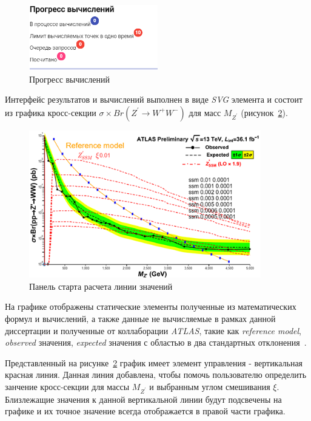 \begin{figure}[!h]
	\centering
	\includegraphics[width=0.5\textwidth]{figures/progress.png}
	\caption{Прогресс вычислений}
	\label{fig:progress}
\end{figure}

Интерфейс результатов и вычислений выполнен в виде \textit{SVG} элемента и состоит из графика кросс-секции $\sigma \times Br({Z}^{\prime} \rightarrow {W}^{+}{W}^{-})$ для масс ${M}_{{Z}^{\prime}}$ (рисунок~\ref{fig:graph-1}).

\begin{figure}[!h]
	\centering
	\includegraphics[width=0.9\textwidth]{figures/graph-1.png}
	\caption{Панель старта расчета линии значений}
	\label{fig:graph-1}
\end{figure}

На графике отображены статические элементы полученные из математических формул и вычислений, а также данные не вычисляемые в рамках данной диссертации и полученные от коллаборации \textit{ATLAS}, такие  как \textit{reference model}, \textit{observed} значения, \textit{expected} значения с областью в два стандартных отклонения~\cite{2part-pankov}.

Представленный на рисунке~\ref{fig:graph-1} график имеет элемент управления - вертикальная красная линия. Данная линия добавлена, чтобы помочь пользователю определить занчение кросс-секции для массы ${M}_{{Z}^{\prime}}$ и выбранным углом смешивания $\xi$. Близлежащие значения к данной вертикальной линии будут подсвечены на графике и их точное значение всегда отображается в правой части графика.

